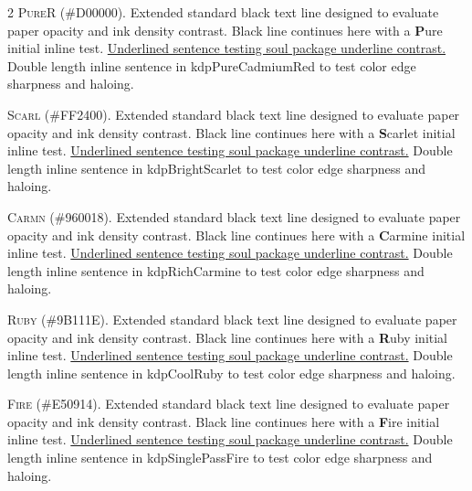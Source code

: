 \documentclass[9pt]{article}
\let\oldlettrine\lettrine
\renewcommand{\lettrine}[3][]{%
	\clubpenalty=10000
	\oldlettrine[#1]{#2}{#3}%
}
\begin{document}
\begin{multicols}{2}
\lettrine[lines=2]{\textcolor{kdpPureCadmiumRed}{P}}{ureR} (\#D00000). Extended standard black text line designed to evaluate paper opacity and ink density contrast. Black line continues here with a \textbf{\textcolor{kdpPureCadmiumRed}{P}}ure initial inline test. \ul{Underlined sentence testing soul package underline contrast.} \textcolor{kdpPureCadmiumRed}{Double length inline sentence in kdpPureCadmiumRed to test color edge sharpness and haloing.}
\medskip

\lettrine[lines=2]{\textcolor{kdpBrightScarlet}{S}}{carl} (\#FF2400). Extended standard black text line designed to evaluate paper opacity and ink density contrast. Black line continues here with a \textbf{\textcolor{kdpBrightScarlet}{S}}carlet initial inline test. \ul{Underlined sentence testing soul package underline contrast.} \textcolor{kdpBrightScarlet}{Double length inline sentence in kdpBrightScarlet to test color edge sharpness and haloing.}
\medskip

\lettrine[lines=2]{\textcolor{kdpRichCarmine}{C}}{armn} (\#960018). Extended standard black text line designed to evaluate paper opacity and ink density contrast. Black line continues here with a \textbf{\textcolor{kdpRichCarmine}{C}}armine initial inline test. \ul{Underlined sentence testing soul package underline contrast.} \textcolor{kdpRichCarmine}{Double length inline sentence in kdpRichCarmine to test color edge sharpness and haloing.}
\medskip

\lettrine[lines=2]{\textcolor{kdpCoolRuby}{R}}{uby} (\#9B111E). Extended standard black text line designed to evaluate paper opacity and ink density contrast. Black line continues here with a \textbf{\textcolor{kdpCoolRuby}{R}}uby initial inline test. \ul{Underlined sentence testing soul package underline contrast.} \textcolor{kdpCoolRuby}{Double length inline sentence in kdpCoolRuby to test color edge sharpness and haloing.}
\medskip

\lettrine[lines=2]{\textcolor{kdpSinglePassFire}{F}}{ire} (\#E50914). Extended standard black text line designed to evaluate paper opacity and ink density contrast. Black line continues here with a \textbf{\textcolor{kdpSinglePassFire}{F}}ire initial inline test. \ul{Underlined sentence testing soul package underline contrast.} \textcolor{kdpSinglePassFire}{Double length inline sentence in kdpSinglePassFire to test color edge sharpness and haloing.}
\medskip


\end{multicols}
\end{document}
